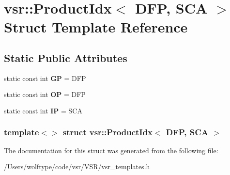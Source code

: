 \hypertarget{structvsr_1_1_product_idx_3_01_d_f_p_00_01_s_c_a_01_4}{\section{vsr\-:\-:Product\-Idx$<$ D\-F\-P, S\-C\-A $>$ Struct Template Reference}
\label{structvsr_1_1_product_idx_3_01_d_f_p_00_01_s_c_a_01_4}
}
\subsection*{Static Public Attributes}
\begin{DoxyCompactItemize}
\item 
\hypertarget{structvsr_1_1_product_idx_3_01_d_f_p_00_01_s_c_a_01_4_a773131f08685af4de2b05c28ca3b1077}{static const int {\bfseries G\-P} = D\-F\-P}\label{structvsr_1_1_product_idx_3_01_d_f_p_00_01_s_c_a_01_4_a773131f08685af4de2b05c28ca3b1077}

\item 
\hypertarget{structvsr_1_1_product_idx_3_01_d_f_p_00_01_s_c_a_01_4_aa7aeb3c62cbdd029a150e899481bef85}{static const int {\bfseries O\-P} = D\-F\-P}\label{structvsr_1_1_product_idx_3_01_d_f_p_00_01_s_c_a_01_4_aa7aeb3c62cbdd029a150e899481bef85}

\item 
\hypertarget{structvsr_1_1_product_idx_3_01_d_f_p_00_01_s_c_a_01_4_a333ba082932f74d8192e5b9636080b27}{static const int {\bfseries I\-P} = S\-C\-A}\label{structvsr_1_1_product_idx_3_01_d_f_p_00_01_s_c_a_01_4_a333ba082932f74d8192e5b9636080b27}

\end{DoxyCompactItemize}
\subsubsection*{template$<$$>$ struct vsr\-::\-Product\-Idx$<$ D\-F\-P, S\-C\-A $>$}



The documentation for this struct was generated from the following file\-:\begin{DoxyCompactItemize}
\item 
/\-Users/wolftype/code/vsr/\-V\-S\-R/vsr\-\_\-templates.\-h\end{DoxyCompactItemize}
